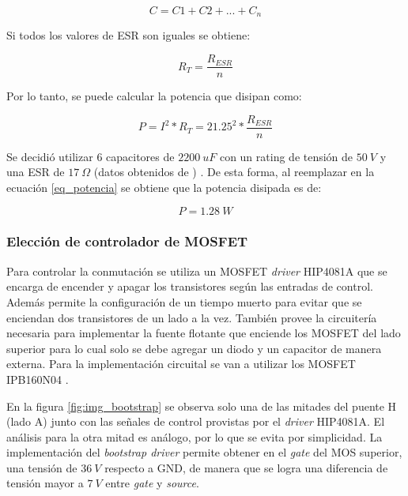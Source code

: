 \begin{equation} 
	C = C1 + C2 + ... + C_n
\end{equation}


\noindent Si todos los valores de ESR son iguales se obtiene:

\begin{equation} 
	R_T = \frac{R_{ESR}}{n}
\end{equation}

\noindent Por lo tanto, se puede calcular la potencia que disipan como:

\begin{equation}\label{eq_potencia} 
	P = I^2 * R_T = 21.25^2 * \frac{R_{ESR}}{n}
\end{equation}

\noindent Se decidió utilizar 6 capacitores  de $2200 \:uF$ con un rating de tensión de $50\:V$ y una ESR de $17 \:\Omega$ (datos obtenidos de \cite{EKY-350ELL222MM25S}) . De esta forma, al reemplazar en la ecuación \ref{eq_potencia} se obtiene que la potencia disipada es de: 

\begin{equation} 
	P=1.28\:W
\end{equation}

\subsubsection{Elección de controlador de MOSFET}

\noindent Para controlar la conmutación se utiliza un MOSFET \textsl{driver} HIP4081A \cite{HIP4081A_FN3659} que se encarga de encender y apagar los transistores según las entradas de control. Además permite la configuración de un tiempo muerto para evitar que se enciendan dos transistores de un lado a la vez. También provee la circuitería necesaria para implementar la fuente flotante que enciende los MOSFET del lado superior para lo cual solo se debe agregar un diodo y un capacitor de manera externa. Para la implementación circuital se van a utilizar los MOSFET IPB160N04 \cite{IPB160N04}.

\noindent En la figura \ref{fig:img_bootstrap} se observa solo una de las mitades del puente H (lado A)  junto con las señales de control provistas por el \textsl{driver} HIP4081A. El análisis para la otra mitad es análogo, por lo que se evita por simplicidad. La implementación del \textsl{bootstrap driver} permite obtener en el \textsl{gate} del MOS superior, una tensión de $36\:V$ respecto a GND, de manera que se logra una diferencia de tensión mayor a $7\:V$ entre \textsl{gate} y \textsl{source}. 

